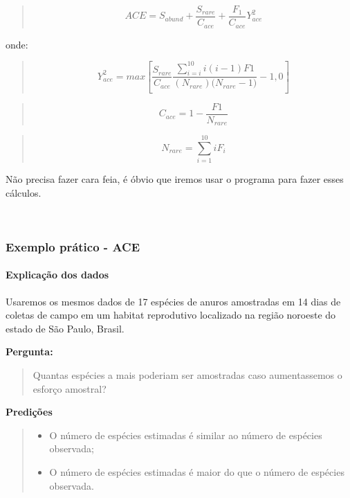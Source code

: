 \documentclass[
]{book}
\providecommand{\tightlist}{%
  \setlength{\itemsep}{0pt}\setlength{\parskip}{0pt}}
\begin{document}
\begin{quote}
\[ACE = S_{abund} + \frac{S_{rare}}{C_{ace}} + \frac{F_1}{C_{ace}}Y_{ace}^2\]
\end{quote}

onde:

\begin{quote}
\[Y_{ace}^2 = max \left[\frac{S_{rare}}{C_{ace}}\frac{\sum_{i=i}^{10}i(i-1)F1}{(N_{rare})({N_{rare} - 1)}}-1,0\right]\]
\end{quote}

\begin{quote}
\[C_{ace} = 1 - \frac{F1}{N_{rare}}\]
\end{quote}

\begin{quote}
\[N_{rare} = \sum_{i=1}^{10}iF_i\]
\end{quote}

Não precisa fazer cara feia, é óbvio que iremos usar o programa para fazer esses cálculos.

~

\hypertarget{exemplo-pruxe1tico---ace}{%
\subsubsection{Exemplo prático - ACE}\label{exemplo-pruxe1tico---ace}}

\hypertarget{explicauxe7uxe3o-dos-dados-1}{%
\paragraph{Explicação dos dados}\label{explicauxe7uxe3o-dos-dados-1}}

Usaremos os mesmos dados de 17 espécies de anuros amostradas em 14 dias de coletas de campo em um habitat reprodutivo localizado na região noroeste do estado de São Paulo, Brasil.

\textbf{Pergunta:}

\begin{quote}
Quantas espécies a mais poderiam ser amostradas caso aumentassemos o esforço amostral?
\end{quote}

\textbf{Predições}

\begin{quote}
\begin{itemize}
\tightlist
\item
  O número de espécies estimadas é similar ao número de espécies observada;
\item
  O número de espécies estimadas é maior do que o número de espécies observada.
\end{itemize}
\end{quote}
\end{document}
